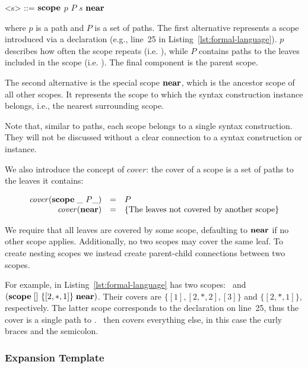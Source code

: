 \documentclass{kththesis}
\newcommand{\ssynt}[1]{\ensuremath{\mathit{#1}}}
\newenvironment{sgrammar}{\begin{grammar}\renewcommand{\grammarlabel}[2]{\ssynt{##1} \hfill##2}}{\end{grammar}}
\begin{document}
\setlength{\grammarindent}{3em}
\begin{sgrammar}
<s> ::= $\mathrel{\mathbf{scope}}$ $p$ $P$ $\ssynt{s}$
  \alt $\mathrel{\mathbf{near}}$
\end{sgrammar}

where $p$ is a path and $P$ is a set of paths. The first alternative represents a scope introduced via a  declaration (e.g., line~25 in Listing~\ref{lst:formal-language}). $p$ describes how often the scope repeats (i.e. ), while $P$ contains paths to the leaves included in the scope (i.e. ). The final component is the parent scope.

The second alternative is the special scope $\mathrel{\mathbf{near}}$, which is the ancestor scope of all other scopes. It represents the scope to which the syntax construction instance belongs, i.e., the nearest surrounding scope.

Note that, similar to paths, each scope belongs to a single syntax construction. They will not be discussed without a clear connection to a syntax construction or instance.

\newcommand{\cover}{\ensuremath{\mathit{cover}}}
We also introduce the concept of \cover: the cover of a scope is a set of paths to the leaves it contains:

$$
\begin{array}{rcl}
\cover(\scope \_\ P \_) & = & P \\
\cover(\near) & = & \{\text{The leaves not covered by another scope}\} \\
\end{array}
$$

We require that all leaves are covered by some scope, defaulting to $\mathrel{\mathbf{near}}$ if no other scope applies. Additionally, no two scopes may cover the same leaf. To create nesting scopes we instead create parent-child connections between two scopes.

For example,  in Listing~\ref{lst:formal-language} has two scopes: \near\ and $(\mathrel{\mathbf{scope}} []\ \{[2, *, 1]\} \mathrel{\mathbf{near}})$. Their covers are $\{[1], [2, *, 2], [3]\}$ and $\{[2, *, 1]\}$, respectively. The latter scope corresponds to the  declaration on line~25, thus the cover is a single path to . \near\ then covers everything else, in this case the curly braces and the semicolon.

\subsubsection{Expansion Template}
\end{document}
